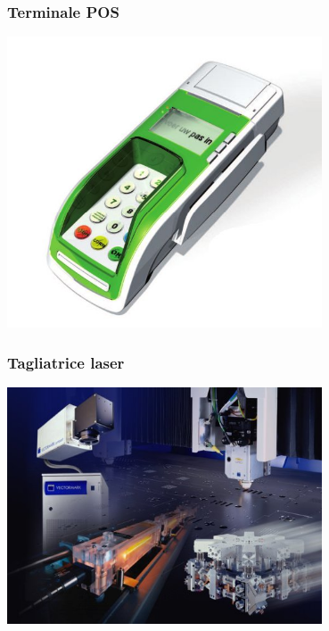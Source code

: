 \documentclass[xetex,table]{beamer}
\begin{document}
\begin{frame}
\frametitle{Terminale POS}
  \begin{center}
    \includegraphics[width=0.7\textwidth]{images/point-of-sale.jpg}
  \end{center}
\end{frame}

\begin{frame}
\frametitle{Tagliatrice laser}
  \begin{center}
    \includegraphics[width=0.7\textwidth]{images/laser-cutting-machine.jpg}
  \end{center}
\end{frame}
\end{document}
